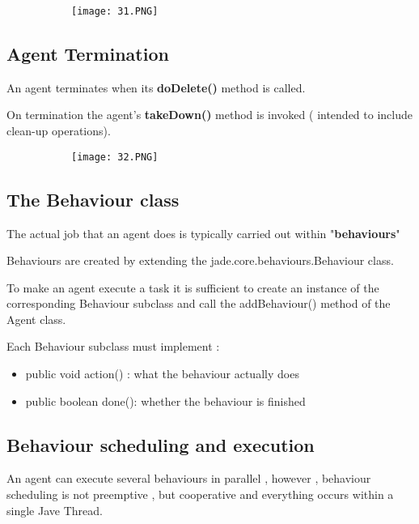 \documentclass{article}
\begin{document}
\begin{figure}[ht!]
  \centering
  \begin{subfigure}[b]{0.6\linewidth}
    \texttt{[image: 31.PNG]}
  \end{subfigure}
  \end{figure}

\subsection{Agent Termination}

An agent terminates when its \textbf{doDelete()} method is called.

On termination the agent's \textbf{takeDown()} method is invoked ( intended to include clean-up operations).

\begin{figure}[ht!]
  \centering
  \begin{subfigure}[b]{0.6\linewidth}
    \texttt{[image: 32.PNG]}
  \end{subfigure}
  \end{figure}

\subsection{The Behaviour class}

The actual job that an agent does is typically carried out within "\textbf{behaviours}"

Behaviours are created by extending the jade.core.behaviours.Behaviour class.

To make an agent execute a task it is sufficient to create an instance of the corresponding Behaviour subclass and call the addBehaviour() method of the Agent class.

Each Behaviour subclass must implement : 

\begin{itemize}
    \item public void action() : what the behaviour actually does
    \item public boolean done(): whether the behaviour is finished
\end{itemize}

\subsection{Behaviour scheduling and execution}

An agent can execute several behaviours in parallel , however , behaviour scheduling is not preemptive , but cooperative and everything occurs within a single Jave Thread.
\end{document}
